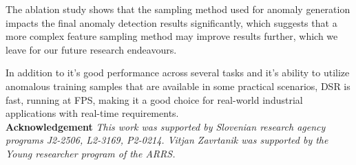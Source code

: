\documentclass[runningheads]{llncs}
\begin{document}
The ablation study shows that the sampling method used for anomaly generation impacts the final anomaly detection results significantly, which suggests that a more complex feature sampling method may improve results further, which we leave for our future research endeavours.

In addition to it's good performance across several tasks and it's ability to utilize anomalous training samples that are available in some practical scenarios, DSR is fast, running at  FPS, making it a good choice for real-world industrial applications with real-time requirements. \\

\noindent \textbf{Acknowledgement} \textit{This work was supported by Slovenian research agency programs J2-2506, L2-3169, P2-0214. Vitjan Zavrtanik was supported by the Young researcher program of the ARRS. }

{\small


}
\end{document}
